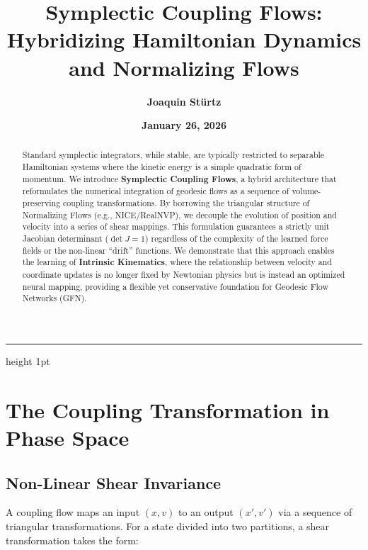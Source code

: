 \documentclass[12pt,a4paper]{article}
\title{\textbf{Symplectic Coupling Flows: Hybridizing Hamiltonian Dynamics\\ and Normalizing Flows}}
\author{\textbf{Joaquin Stürtz}}
\date{\textbf{January 26, 2026}}
\DeclareMathOperator{\det}{det}
\begin{document}
\maketitle
\vspace{-0.5cm}
\begin{center}
\hrule height 1pt
\end{center}
\vspace{0.5cm}

\begin{abstract}
Standard symplectic integrators, while stable, are typically restricted to separable Hamiltonian systems where the kinetic energy is a simple quadratic form of momentum. We introduce \textbf{Symplectic Coupling Flows}, a hybrid architecture that reformulates the numerical integration of geodesic flows as a sequence of volume-preserving coupling transformations. By borrowing the triangular structure of Normalizing Flows (e.g., NICE/RealNVP), we decouple the evolution of position and velocity into a series of shear mappings. This formulation guarantees a strictly unit Jacobian determinant ($\det J = 1$) regardless of the complexity of the learned force fields or the non-linear ``drift'' functions. We demonstrate that this approach enables the learning of \textbf{Intrinsic Kinematics}, where the relationship between velocity and coordinate updates is no longer fixed by Newtonian physics but is instead an optimized neural mapping, providing a flexible yet conservative foundation for Geodesic Flow Networks (GFN).
\end{abstract}

\vspace{1cm}

\section{The Coupling Transformation in Phase Space}

\subsection{Non-Linear Shear Invariance}

A coupling flow maps an input $(x, v)$ to an output $(x', v')$ via a sequence of triangular transformations. For a state divided into two partitions, a shear transformation takes the form:
\end{document}
